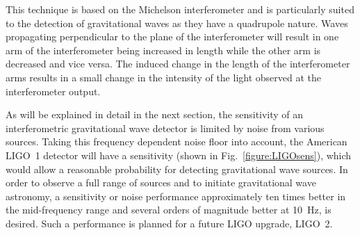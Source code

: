 \documentclass{article}
\begin{document}

This technique is based on the Michelson interferometer and is
particularly suited to the detection of gravitational waves as they
have a quadrupole nature. Waves propagating perpendicular to the plane
of the interferometer will result in one arm of the interferometer
being increased in length while the other arm is decreased and vice
versa. The induced change in the length of the interferometer arms results in
a small change in the intensity of the light observed at the
interferometer output. 

As will be explained in detail in the next section, the sensitivity of
an interferometric gravitational wave detector is limited by noise
from various sources. Taking this frequency dependent noise floor into
account, the American LIGO~1 detector will have a sensitivity (shown
in Fig.~\ref{figure:LIGOsens}), which would allow a reasonable
probability for detecting gravitational wave sources. In order to
observe a full range of sources and to initiate gravitational wave
astronomy, a sensitivity or noise performance approximately ten times
better in the mid-frequency range and several orders of magnitude
better at 10~Hz, is desired. Such a performance is planned for a
future LIGO upgrade, LIGO~2.
\end{document}
